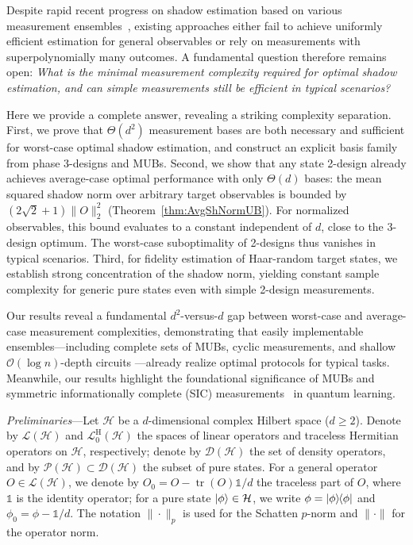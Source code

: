 \documentclass[aps,pra,twocolumn,nofootinbib,superscriptaddress,10pt]{revtex4-2}
\DeclarePairedDelimiter{\ket}{\lvert}{\rangle}
\DeclarePairedDelimiter{\bra}{\langle}{\rvert}
\newcommand{\ketbra}[2]{\ket{#1}\mkern-2mu\bra{#2}}
\newcommand{\proj}[1]{\ketbra{#1}{#1}}
\DeclareMathOperator{\tr}{tr}
\newcommand{\bbone}{\mathds{1}}
\newcommand{\caD}{\mathcal{D}}
\newcommand{\caH}{\mathcal{H}}
\newcommand{\caL}{\mathcal{L}}
\newcommand{\caO}{\mathcal{O}}
\newcommand{\caP}{\mathcal{P}}
\newcommand{\rmH}{\mathrm{H}}
\newcommand{\thref}[1]{Theorem~\ref{#1}}
\begin{document}

Despite rapid recent progress on shadow estimation based on various measurement ensembles~\cite{Elben23,HuangKP20,Hu23,Bu24,Hu22,Liu24,Zhang24,WangC24,Park25,Wu26,Ippoliti24,West26}, existing approaches either fail to achieve uniformly efficient estimation for general observables or rely on measurements with superpolynomially many outcomes. A fundamental question therefore remains open: \emph{What is the minimal measurement complexity required for optimal shadow estimation, and can simple measurements still be efficient in typical scenarios?} 


Here we provide a complete answer, revealing a striking complexity separation. First, we prove that $\Theta(d^2)$ measurement bases are both necessary and sufficient for worst-case optimal shadow estimation, and construct an explicit basis family from phase 3-designs and MUBs. Second, we show that any state 2-design already achieves average-case
optimal performance with only $\Theta(d)$ bases: the mean squared shadow
norm over arbitrary target observables is bounded by $\left(2\sqrt{2}+1\right)\|O\|_2^2$
(\thref{thm:AvgShNormUB}). For normalized observables, this bound
evaluates to a constant independent of $d$, close to the 3-design optimum. The worst-case suboptimality of 2-designs thus vanishes in typical scenarios. Third, for fidelity estimation of Haar-random target states, we establish strong concentration of the shadow norm, yielding constant sample complexity for generic pure states even with simple 2-design measurements.


Our results reveal a fundamental $d^2$-versus-$d$ gap between worst-case and average-case measurement complexities, demonstrating that easily implementable ensembles---including complete sets of MUBs, cyclic measurements, and shallow $\caO(\log n)$-depth circuits \cite{Cleve16,Bertoni24,Hu25,Schuster25}---already realize optimal protocols for typical tasks. Meanwhile, our results highlight the foundational significance of MUBs and
symmetric informationally complete (SIC) measurements~\cite{Fuchs17,Zauner11,Renes04} in quantum learning.


	
\emph{Preliminaries}---Let $\caH$ be a $d$-dimensional complex Hilbert space ($d\geq 2$). Denote by $\caL(\caH)$ and $\caL^{\rmH}_0(\caH)$ the spaces of linear operators and traceless Hermitian operators on 
$\caH$, respectively;  denote by $\caD(\caH)$ the set of density operators, and by $\caP(\caH)\subset\caD(\caH)$ the subset of pure states. For a general operator $O\in \caL(\caH)$, we denote by $O_0=O-\tr(O)\bbone/d$ the traceless part of $O$, where $\bbone$ is the identity operator; for a pure state $\ket{\phi}\in\caH$, we write $\phi=\proj{\phi}$ and $\phi_0=\phi-\bbone/d$. The notation $\|\cdot\|_p$ is used for the Schatten $p$-norm and $\|\cdot\|$ for the operator norm.
\end{document}
